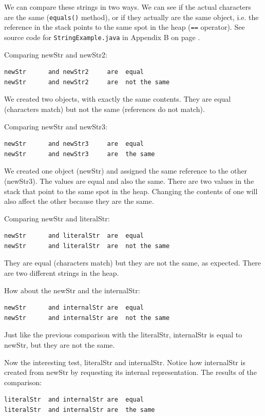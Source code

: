 We can compare these strings in two ways. We can see if the actual characters are the same (\texttt{equals()} method), or if they actually are the same object, i.e. the reference in the stack points to the same spot in the heap (\texttt{==} operator). See source code for \texttt{StringExample.java} in Appendix B on page \pageref{App:AppendixB}.

Comparing newStr and newStr2:
\begin{lstlisting}[language=Java]
newStr      and newStr2     are  equal
newStr      and newStr2     are  not the same
\end{lstlisting}

We created two objects, with exactly the same contents. They are equal (characters match) but not the same (references do not match).

Comparing newStr and newStr3:
\begin{lstlisting}[language=Java]
newStr      and newStr3     are  equal
newStr      and newStr3     are  the same
\end{lstlisting}

We created one object (newStr) and assigned the same reference to the other (newStr3). The values are equal and also the same. There are two values in the stack that point to the same spot in the heap. Changing the contents of one will also affect the other because they are the same.

Comparing newStr and literalStr:
\begin{lstlisting}[language=Java]
newStr      and literalStr  are  equal
newStr      and literalStr  are  not the same
\end{lstlisting}

They are equal (characters match) but they are not the same, as expected. There are two different strings in the heap.

How about the newStr and the internalStr:
\begin{lstlisting}[language=Java]
newStr      and internalStr are  equal
newStr      and internalStr are  not the same
\end{lstlisting}

Just like the previous comparison with the literalStr, internalStr is equal to newStr, but they are not the same.

Now the interesting test, literalStr and internalStr. Notice how internalStr is created from newStr by requesting its internal representation. The results of the comparison:
\begin{lstlisting}[language=Java]
literalStr  and internalStr are  equal
literalStr  and internalStr are  the same
\end{lstlisting}

